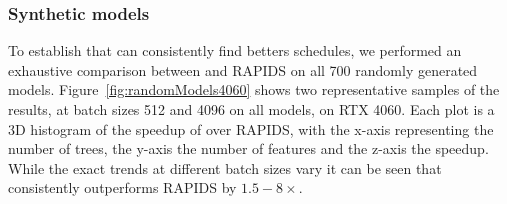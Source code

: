 \subsubsection*{Synthetic models}
To establish that \Treebeard{} can consistently find betters schedules, we performed an exhaustive comparison between \Treebeard{} and RAPIDS on all 700 randomly generated models.   
Figure~\ref{fig:randomModels4060} shows two representative samples of the results, at batch sizes 512 and 4096 on all models, on RTX 4060. 
Each plot is a 3D histogram of the speedup of \Treebeard{} over RAPIDS, with the x-axis representing the number of trees, the y-axis the number of features and the z-axis the speedup. 
While the exact trends at different batch sizes vary it can be seen that \Treebeard{} consistently outperforms RAPIDS by $1.5-8\times$. 
